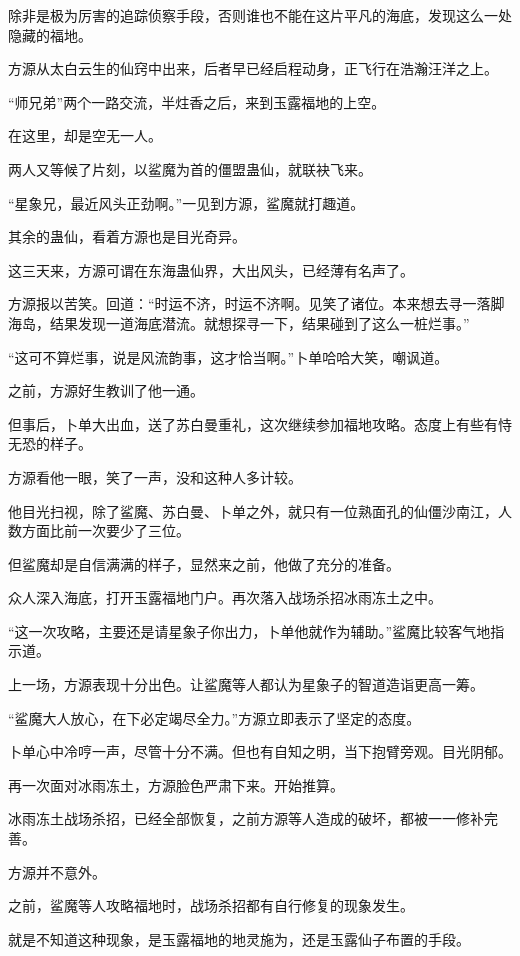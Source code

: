 \begin{this_body}
除非是极为厉害的追踪侦察手段，否则谁也不能在这片平凡的海底，发现这么一处隐藏的福地。

方源从太白云生的仙窍中出来，后者早已经启程动身，正飞行在浩瀚汪洋之上。

“师兄弟”两个一路交流，半炷香之后，来到玉露福地的上空。

在这里，却是空无一人。

两人又等候了片刻，以鲨魔为首的僵盟蛊仙，就联袂飞来。

“星象兄，最近风头正劲啊。”一见到方源，鲨魔就打趣道。

其余的蛊仙，看着方源也是目光奇异。

这三天来，方源可谓在东海蛊仙界，大出风头，已经薄有名声了。

方源报以苦笑。回道：“时运不济，时运不济啊。见笑了诸位。本来想去寻一落脚海岛，结果发现一道海底潜流。就想探寻一下，结果碰到了这么一桩烂事。”

“这可不算烂事，说是风流韵事，这才恰当啊。”卜单哈哈大笑，嘲讽道。

之前，方源好生教训了他一通。

但事后，卜单大出血，送了苏白曼重礼，这次继续参加福地攻略。态度上有些有恃无恐的样子。

方源看他一眼，笑了一声，没和这种人多计较。

他目光扫视，除了鲨魔、苏白曼、卜单之外，就只有一位熟面孔的仙僵沙南江，人数方面比前一次要少了三位。

但鲨魔却是自信满满的样子，显然来之前，他做了充分的准备。

众人深入海底，打开玉露福地门户。再次落入战场杀招冰雨冻土之中。

“这一次攻略，主要还是请星象子你出力，卜单他就作为辅助。”鲨魔比较客气地指示道。

上一场，方源表现十分出色。让鲨魔等人都认为星象子的智道造诣更高一筹。

“鲨魔大人放心，在下必定竭尽全力。”方源立即表示了坚定的态度。

卜单心中冷哼一声，尽管十分不满。但也有自知之明，当下抱臂旁观。目光阴郁。

再一次面对冰雨冻土，方源脸色严肃下来。开始推算。

冰雨冻土战场杀招，已经全部恢复，之前方源等人造成的破坏，都被一一修补完善。

方源并不意外。

之前，鲨魔等人攻略福地时，战场杀招都有自行修复的现象发生。

就是不知道这种现象，是玉露福地的地灵施为，还是玉露仙子布置的手段。


\end{this_body}
